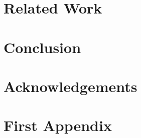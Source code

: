 \documentclass[english]{llncs}
\begin{document}
\section{Related Work}
\label{related}



\section{Conclusion}
\label{conclusion}


\section{Acknowledgements}
\label{acknowledgements}



\nocite{*}


\appendix
\section{First Appendix}
\end{document}

